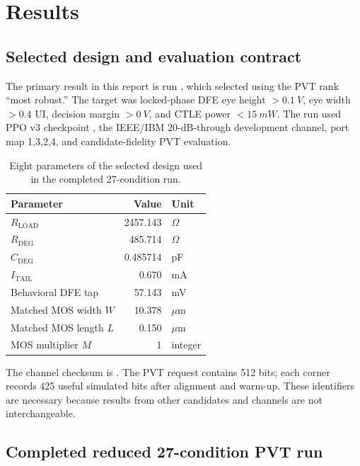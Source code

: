 \chapter{Results}

\section{Selected design and evaluation contract}

The primary result in this report is run
, which selected
 using the PVT rank ``most robust.'' The target was
locked-phase DFE eye height $>\SI{0.1}{V}$, eye width $>0.4$ UI, decision
margin $>\SI{0}{V}$, and CTLE power $<\SI{15}{mW}$. The run used PPO v3
checkpoint , the IEEE/IBM 20-dB-through
development channel, port map 1,3,2,4, and candidate-fidelity PVT evaluation.

\begin{table}[htbp]
\centering
\caption{Eight parameters of the selected design used in the completed
27-condition run.}
\label{tab:selected-design}
\begin{tabular}{@{}l r l@{}}
\toprule
Parameter & Value & Unit \\
\midrule
$R_{\mathrm{LOAD}}$ & 2457.143 & $\Omega$ \\
$R_{\mathrm{DEG}}$ & 485.714 & $\Omega$ \\
$C_{\mathrm{DEG}}$ & 0.485714 & pF \\
$I_{\mathrm{TAIL}}$ & 0.670 & mA \\
Behavioral DFE tap & 57.143 & mV \\
Matched MOS width $W$ & 10.378 & $\mu$m \\
Matched MOS length $L$ & 0.150 & $\mu$m \\
MOS multiplier $M$ & 1 & integer \\
\bottomrule
\end{tabular}
\end{table}

The channel checksum is
.
The PVT request contains 512 bits; each corner records 425 useful simulated bits
after alignment and warm-up. These identifiers are necessary because results
from other candidates and channels are not interchangeable.

\section{Completed reduced 27-condition PVT run}

